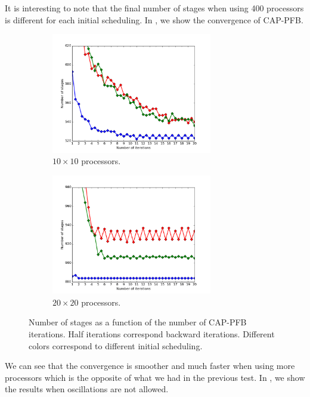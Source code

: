 \documentclass[letterpaper]{article}
\renewcommand{\(}{\left(}
\renewcommand{\)}{\right)}
\renewcommand{\[}{\left[}
\renewcommand{\]}{\right]}
\begin{document}
It is interesting to note that the final number of stages when using 400
processors is different for each initial scheduling. In ,
we show the convergence of CAP-PFB. 

\begin{figure}[H]
  \begin{subfigure}[b]{.5\textwidth}
    \centering
    \includegraphics[width=7cm]{convergence_band_20_20}
    \caption{$10\times 10$ processors.}
  \end{subfigure}
  \begin{subfigure}[b]{.5\textwidth}
    \centering
    \includegraphics[width=7cm]{convergence_band_40_40}
    \caption{$20\times 20$ processors.}
  \end{subfigure}
  \caption{Number of stages as a function of the number of CAP-PFB iterations.
  Half iterations correspond backward iterations. Different colors correspond to
  different initial scheduling.}
  \label{convergence_band}
\end{figure}
 
We can see that the convergence is smoother and much faster when using more
processors which is the opposite of what we had in the previous test. In
, we show the results when oscillations are not allowed.
\end{document}
